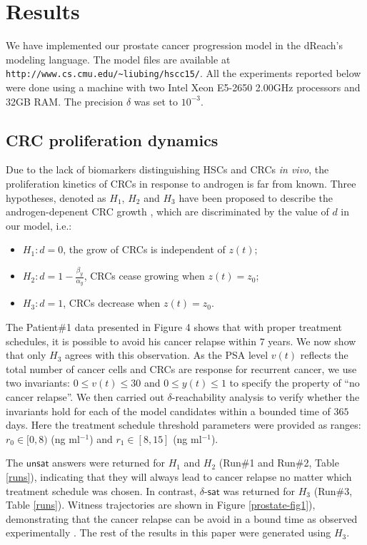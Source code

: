 \section{Results}\label{sec.results}

We have implemented our prostate cancer progression model in the dReach's modeling language. The model files are available at \verb#http://www.cs.cmu.edu/~liubing/hscc15/#. All the experiments reported below were done using a machine with two Intel Xeon E5-2650 2.00GHz processors and 32GB RAM. The precision $\delta$ was set to $10^{-3}$. 

\subsection{CRC proliferation dynamics}
Due to the lack of biomarkers distinguishing HSCs and CRCs \textit{in vivo}, the proliferation kinetics of CRCs in response to androgen is far from known. Three hypotheses, denoted as $H_1$, $H_2$ and $H_3$ have been proposed to describe the androgen-depenent CRC growth \cite{ideta08}, which are discriminated by the value of $d$ in our model, i.e.:
\begin{itemize}
\item $H_1: d = 0$, the grow of CRCs is independent of $z(t)$;
\item $H_2: d = 1-\frac{\beta_y}{\alpha_y}$, CRCs cease growing when $z(t)=z_0$;
\item $H_3: d = 1$, CRCs decrease when $z(t)=z_0$.
\end{itemize} 

The Patient\#1 data presented in Figure 4 shows that with proper treatment schedules, it is possible to avoid his cancer relapse within $7$ years. We now show that only $H_3$ agrees with this observation. As the PSA level $v(t)$ reflects the total number of cancer cells and CRCs are response for recurrent cancer, we use two invariants: $0 \le v(t) \le 30$ and $0 \le y(t) \le 1$ to specify the property of ``no cancer relapse''. We then carried out $\delta$-reachability analysis to verify whether the invariants hold for each of the model candidates within a bounded time of $365$ days. Here the treatment schedule threshold parameters were provided as ranges: $r_0 \in [0, 8)$ (ng ml$^{-1}$) and $r_1 \in [8,15]$ (ng ml$^{-1}$).


The $\mathsf{unsat}$ answers were returned for $H_1$ and $H_2$ (Run\#1 and Run\#2, Table \ref{runs}), indicating that they will always lead to cancer relapse no matter which 
treatment schedule 
was chosen. In contrast, $\delta$-$\mathsf{sat}$ was returned for $H_3$ (Run\#3, Table \ref{runs}). Witness trajectories are shown in Figure \ref{prostate-fig1}), demonstrating that the cancer relapse can be avoid in a bound time as observed experimentally \cite{ bruchovsky06,bruchovsky07}. The rest of the results in this paper were generated using $H_3$.

